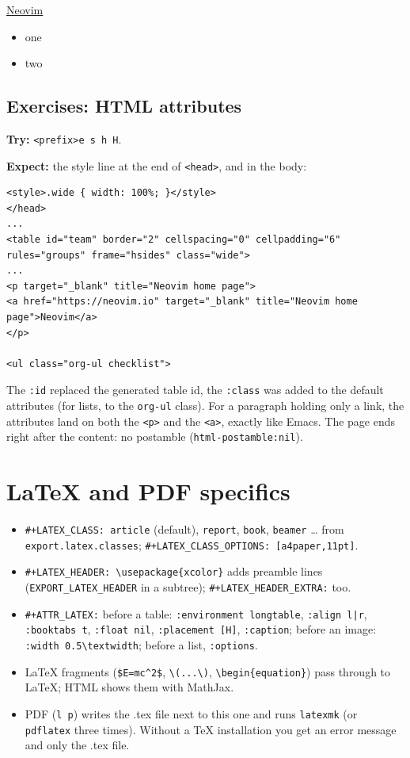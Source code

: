 \href{https://neovim.io}{Neovim}

\begin{itemize}
\item one
\item two
\end{itemize}
\subsection{Exercises: HTML attributes}
\label{sec:orgf5c2116}
\textbf{Try:} \texttt{<prefix>e s h H}.

\textbf{Expect:} the style line at the end of \texttt{<head>}, and in the body:

\begin{verbatim}
<style>.wide { width: 100%; }</style>
</head>
...
<table id="team" border="2" cellspacing="0" cellpadding="6" rules="groups" frame="hsides" class="wide">
...
<p target="_blank" title="Neovim home page">
<a href="https://neovim.io" target="_blank" title="Neovim home page">Neovim</a>
</p>

<ul class="org-ul checklist">
\end{verbatim}

The \texttt{:id} replaced the generated table id, the \texttt{:class} was added to the
default attributes (for lists, to the \texttt{org-ul} class). For a paragraph
holding only a link, the attributes land on both the \texttt{<p>} and the \texttt{<a>},
exactly like Emacs. The page ends right after the content: no postamble
(\texttt{html-postamble:nil}).
\section{\LaTeX{} and PDF specifics}
\label{sec:org058cbc1}
\begin{itemize}
\item \texttt{\#+LATEX\_CLASS: article} (default), \texttt{report}, \texttt{book}, \texttt{beamer} \ldots{} from
\texttt{export.latex.classes}; \texttt{\#+LATEX\_CLASS\_OPTIONS: [a4paper,11pt]}.
\item \texttt{\#+LATEX\_HEADER: \textbackslash{}usepackage\{xcolor\}} adds preamble lines
(\texttt{EXPORT\_LATEX\_HEADER} in a subtree); \texttt{\#+LATEX\_HEADER\_EXTRA:} too.
\item \texttt{\#+ATTR\_LATEX:} before a table: \texttt{:environment longtable}, \texttt{:align
  l|r}, \texttt{:booktabs t}, \texttt{:float nil}, \texttt{:placement [H]}, \texttt{:caption}; before
an image: \texttt{:width 0.5\textbackslash{}textwidth}; before a list, \texttt{:options}.
\item \LaTeX{} fragments (\texttt{\$E=mc\textasciicircum{}2\$}, \texttt{\textbackslash{}(...\textbackslash{})}, \texttt{\textbackslash{}begin\{equation\}}) pass through
to \LaTeX{}; HTML shows them with MathJax.
\item PDF (\texttt{l p}) writes the .tex file next to this one and runs \texttt{latexmk}
(or \texttt{pdflatex} three times). Without a \TeX{} installation you get an error
message and only the .tex file.
\end{itemize}
